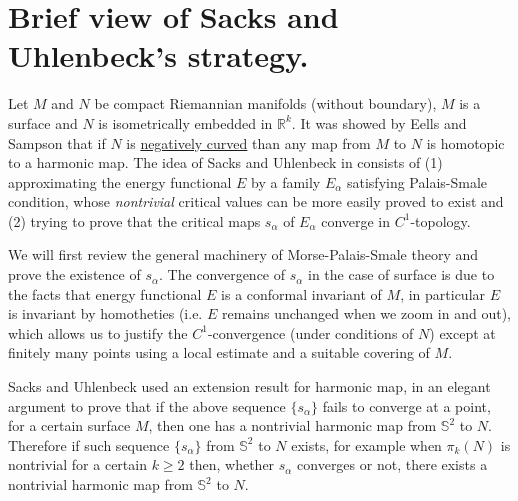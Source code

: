 \iffalse
\begin{info}
The PDF version of this page can be downloaded by replacing \texttt{html} in the its address by
\texttt{pdf}. 
For example \texttt{/html/sheaf-cohomology.html} should become \texttt{/pdf/sheaf-cohomology.pdf}.
\end{info}
\fi

\iffalse
This post is my reading note for \cite{sacks_existence_1981}. I want to present the authors'
ideas as clear as possible and I may probably skip a few (important) details and computations.
\fi

\section{Brief view of Sacks and Uhlenbeck's strategy.}
\label{sec:org4fcb43b}

Let \(M\) and \(N\) be compact Riemannian manifolds (without boundary), \(M\) is a
surface and \(N\) is isometrically embedded in \(\mathbb{R}^k\). It was showed by
Eells and Sampson \cite{eells_harmonic_1964} that if \(N\) is \href{harmonic-map-existence.org}{negatively curved} than any
map from \(M\) to \(N\) is homotopic to a harmonic map. The idea of Sacks and
Uhlenbeck in \cite{sacks_existence_1981} consists of (1) approximating the energy functional
\(E\) by a family \(E_\alpha\) satisfying Palais-Smale condition, whose
\emph{nontrivial} critical values can be more easily proved to exist and (2) trying to prove
that the critical maps \(s_\alpha\) of \(E_\alpha\) converge in \(C^1\)-topology.

We will first review the general machinery of Morse-Palais-Smale theory and prove the existence
of \(s_\alpha\). The convergence of \(s_\alpha\) in the case of surface is due to the
facts that energy functional \(E\) is a conformal invariant of \(M\), in particular \(E\) is
invariant by homotheties (i.e.  \(E\) remains unchanged when we zoom in and out), which
allows us to justify the \(C^1\)-convergence (under conditions of \(N\)) except at
finitely many points using a local estimate and a suitable
covering of \(M\). 

Sacks and Uhlenbeck used an extension result for harmonic map, in an elegant argument
to prove that if the above sequence \(\{s_\alpha\}\) fails to converge at a point,
for a certain surface \(M\), then one has a nontrivial harmonic map from \(\mathbb{S}^2\) to \(N\). Therefore if such sequence \(\{ s_\alpha \}\) from \(\mathbb{S}^2\) to \(N\) exists, for example when \(\pi_k (N)\) is nontrivial for a certain \(k\geq 2\) then, 
whether \(s_\alpha\) converges or not, there exists a nontrivial harmonic map from \(\mathbb{S}^2\) to \(N\). 


